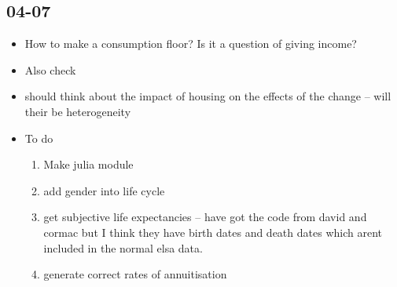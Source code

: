 \documentclass[12pt]{article}
\begin{document}
\subsection{\textbf{04-07}}
\begin{itemize}
  \item How to make a consumption floor? Is it a question of giving income?
  \item Also check
  \item should think about the impact of housing on the effects of the change
        -- will their be heterogeneity

  \item To do
        \begin{enumerate}
          \item Make julia module
          \item add gender into life cycle
          \item get subjective life expectancies -- have got the code from
                david and cormac but I think they have birth dates and death dates which
                arent included in the normal elsa data.
          \item generate correct rates of annuitisation
        \end{enumerate}
\end{itemize}
\end{document}
